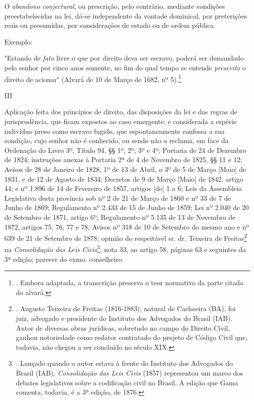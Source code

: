O \emph{abandono conjectural}, ou prescrição, pelo contrário, mediante
condições preestabelecidas na lei, dá-se independente da vontade
dominical, por preterições reais ou presumidas, por considerações de
estado ou de ordem pública.

Exemplo:

"Estando de \emph{fato} livre o que por direito deva ser escravo, poderá
ser demandado pelo senhor por cinco anos somente, no fim do qual tempo
se entende \emph{prescrito} o direito de acionar" (Alvará de 10 de Março
de 1682, nº 5).\footnote{. Embora adaptada, a transcrição preserva o
  teor normativo da parte citada do alvará.}

III

Aplicação feita dos princípios de direito, das disposições da lei e das
regras de jurisprudência, que ficam expostos ao caso emergente; e
considerada a espécie indivíduo preso como escravo fugido, que
espontaneamente confessa a sua condição, cujo senhor não é conhecido, ou
sendo não o reclama, em face da Ordenação do Livro 3º, Título 94, §§ 1º,
2º, 3º e 4º; Portaria de 24 de Dezembro de 1824; instruções anexas à
Portaria 2ª de 4 de Novembro de 1825, §§ 11 e 12; Avisos de 28 de
Janeiro de 1828, 1º de 13 de Abril, o 3º de 5 de Março {[}Maio{]} de
1831, e de 12 de Agosto de 1834; Decretos de 9 de Março {[}Maio{]} de
1842, artigo 44; e nº 1.896 de 14 de Fevereiro de 1857, artigos {[}de{]}
1 a 6; Leis da Assembleia Legislativa desta província sob nº 2 de 21 de
Março de 1860 e nº 33 de 7 de Junho de 1869; Regulamento nº 2.433 de 15
de Junho de 1859; Lei nº 2.040 de 20 de Setembro de 1871, artigo 6º;
Regulamento nº 5.135 de 13 de Novembro de 1872, artigos 75, 76, 77 e 78;
Avisos nº 318 de 10 de Setembro do mesmo ano e nº 639 de 21 de Setembro
de 1878; opinião do respeitável sr. dr. Teixeira de Freitas\footnote{.
  Augusto Teixeira de Freitas (1816-1883), natural de Cachoeira (BA),
  foi juiz, advogado e presidente do Instituto dos Advogados do Brasil
  (IAB). Autor de diversas obras jurídicas, sobretudo no campo do
  Direito Civil, ganhou notoriedade como redator contratado do projeto
  de Código Civil que, todavia, não chegou a ser concluído no século
  XIX.} na \emph{Consolidação das Leis Civis}\footnote{. Lançado quando
  o autor estava à frente do Instituto dos Advogados do Brasil (IAB),
  \emph{Consolidação das Leis Civis} (1857) representou um marco dos
  debates legislativos sobre a codificação civil no Brasil. A edição que
  Gama comenta, todavia, é a 3ª edição, de 1876.}, nota 33, ao artigo
58, páginas 63 e seguintes da 3ª edição; parecer do exmo. conselheiro

